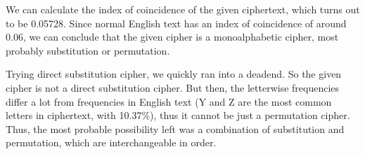 \documentclass[11pt]{article}
\begin{document}
We can calculate the index of coincidence of the given ciphertext, which turns out to be 0.05728. Since normal English text has an index of coincidence of around 0.06, we can conclude that the given cipher is a monoalphabetic cipher, most probably substitution or permutation.
\medskip

Trying direct substitution cipher, we quickly ran into a deadend. So the given cipher is not a direct substitution cipher. But then, the letterwise frequencies differ a lot from frequencies in English text (Y and Z are the most common letters in ciphertext, with 10.37\%), thus it cannot be just a permutation cipher. Thus, the most probable possibility left was a combination of substitution and permutation, which are interchangeable in order.

\pagebreak

\smallskip
\end{document}
